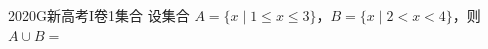 
\begin{problem}{2020}{G}{新高考I卷}{1}{集合}
设集合 $ A=\{x\mid 1\leqslant x\leqslant 3\} $，$ B=\{x\mid 2<x<4\} $，则 $ A\cup B= $
\begin{choices}
\end{choices}
\end{problem}

\begin{answer}

\end{answer}

\begin{solutions}

\end{solutions}
